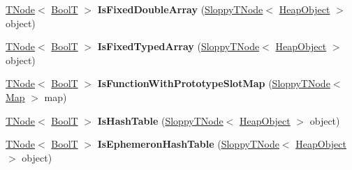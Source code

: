 \begin{DoxyCompactItemize}
\item 
\mbox{\label{classv8_1_1internal_1_1CodeStubAssembler_af865cb26566256efe04a8f3e610ccc8c}} 
\mbox{\hyperlink{classv8_1_1internal_1_1compiler_1_1TNode}{T\+Node}}$<$ \mbox{\hyperlink{structv8_1_1internal_1_1BoolT}{BoolT}} $>$ {\bfseries Is\+Fixed\+Double\+Array} (\mbox{\hyperlink{classv8_1_1internal_1_1compiler_1_1SloppyTNode}{Sloppy\+T\+Node}}$<$ \mbox{\hyperlink{classv8_1_1internal_1_1HeapObject}{Heap\+Object}} $>$ object)
\item 
\mbox{\label{classv8_1_1internal_1_1CodeStubAssembler_a969fcdfaf522b8694fa5aeab8e00aa39}} 
\mbox{\hyperlink{classv8_1_1internal_1_1compiler_1_1TNode}{T\+Node}}$<$ \mbox{\hyperlink{structv8_1_1internal_1_1BoolT}{BoolT}} $>$ {\bfseries Is\+Fixed\+Typed\+Array} (\mbox{\hyperlink{classv8_1_1internal_1_1compiler_1_1SloppyTNode}{Sloppy\+T\+Node}}$<$ \mbox{\hyperlink{classv8_1_1internal_1_1HeapObject}{Heap\+Object}} $>$ object)
\item 
\mbox{\label{classv8_1_1internal_1_1CodeStubAssembler_a678bad10789456c9e5a78ba6c37e0284}} 
\mbox{\hyperlink{classv8_1_1internal_1_1compiler_1_1TNode}{T\+Node}}$<$ \mbox{\hyperlink{structv8_1_1internal_1_1BoolT}{BoolT}} $>$ {\bfseries Is\+Function\+With\+Prototype\+Slot\+Map} (\mbox{\hyperlink{classv8_1_1internal_1_1compiler_1_1SloppyTNode}{Sloppy\+T\+Node}}$<$ \mbox{\hyperlink{classv8_1_1internal_1_1Map}{Map}} $>$ map)
\item 
\mbox{\label{classv8_1_1internal_1_1CodeStubAssembler_a301afc1c7e132fd573a73920e23d1dbf}} 
\mbox{\hyperlink{classv8_1_1internal_1_1compiler_1_1TNode}{T\+Node}}$<$ \mbox{\hyperlink{structv8_1_1internal_1_1BoolT}{BoolT}} $>$ {\bfseries Is\+Hash\+Table} (\mbox{\hyperlink{classv8_1_1internal_1_1compiler_1_1SloppyTNode}{Sloppy\+T\+Node}}$<$ \mbox{\hyperlink{classv8_1_1internal_1_1HeapObject}{Heap\+Object}} $>$ object)
\item 
\mbox{\label{classv8_1_1internal_1_1CodeStubAssembler_a8753b6ad5dc47f4bf42a32e1fe341270}} 
\mbox{\hyperlink{classv8_1_1internal_1_1compiler_1_1TNode}{T\+Node}}$<$ \mbox{\hyperlink{structv8_1_1internal_1_1BoolT}{BoolT}} $>$ {\bfseries Is\+Ephemeron\+Hash\+Table} (\mbox{\hyperlink{classv8_1_1internal_1_1compiler_1_1SloppyTNode}{Sloppy\+T\+Node}}$<$ \mbox{\hyperlink{classv8_1_1internal_1_1HeapObject}{Heap\+Object}} $>$ object)

\end{DoxyCompactItemize}
